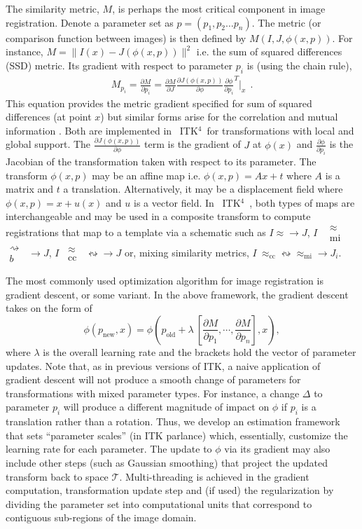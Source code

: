 \documentclass{llncs}
\newcommand{\bsp}{$\substack{
   \rightsquigarrow \\
   b
  }$}
\newcommand{\mi}{$\substack{
   \approx \\
   \text{mi}
  }$}
\newcommand{\cc}{$\substack{
   \approx \\
   \text{cc}
  }$}
\newcommand{\tk}{~ITK$^{\text{4}}$~}
\begin{document}
The similarity metric, $M$, is perhaps the most critical component in image registration.  
Denote a parameter set as $p = (p_1, p_2 \ldots p_n)$.  
The metric (or comparison function between images) is then defined by $M(I,J,\phi(x,p))$.  For instance, $M=\|
I(x)-J(\phi(x,p)) \|^2$ i.e. the sum of squared differences (SSD) metric. Its gradient with respect to parameter $p_i$
is (using the chain rule), 
\begin{eqnarray}
 M_{p_i}=\frac{\partial M}{\partial
  p_i}=\frac{\partial M}{\partial J}\frac{\partial
  J(\phi(x,p))}{\partial \phi} \frac{\partial \phi}{\partial p_i}^T|_x
~~.
\label{eq:grad}
\end{eqnarray}
This equation provides the metric gradient specified for
sum of squared differences (at point $x$) but similar forms arise for the correlation
and mutual information \cite{hermosillo}.  Both are implemented in
\tk for transformations with local and global support.  The
$\frac{\partial J(\phi(x,p))}{\partial \phi}$ term is the gradient of $J$ at $\phi(x)$
and $\frac{\partial \phi}{\partial p_i}$ is the Jacobian of the transformation taken
with respect to its parameter.   The transform $\phi(x,p)$ may be
an affine map i.e. $\phi(x,p)=A x + t$ where $A$ is a matrix and
$t$ a translation.  Alternatively, it may be a displacement field
where $\phi(x,p)=x+u(x)$ and
$u$ is a vector field.  In \tk, both types of maps are interchangeable
and may be used in a composite transform to compute registrations that
map to a template via a schematic such as $ I \approx \rightarrow J $, $ I $ ~\mi~\bsp~$
\rightarrow  J $, $ I $~\cc~$ \leftrightsquigarrow \rightarrow J $
or, mixing similarity metrics, $I
~\approx_\text{cc}  \leftrightsquigarrow \approx_\text{mi}  \rightarrow
J_i $.  

The most commonly used optimization algorithm for image registration
is gradient descent, or some variant.   In the above framework, the
gradient descent takes on the form of
$$
\phi(p_\text{new},x)=\phi(p_\text{old}+\lambda~[ \frac{\partial
  M}{\partial p_1} , \cdots , \frac{\partial
  M}{\partial p_n} ] ,  x ),
$$
where $\lambda$ is the overall learning rate and the brackets hold the
vector of parameter updates.  Note that, as in previous versions of
ITK, a naive application of gradient descent will not produce a smooth
change of parameters for transformations with mixed parameter types.
For instance, a change $\Delta$ to parameter $p_i$ will produce a
different magnitude of impact on $\phi$ if $p_i$ is a translation rather than a
rotation.  Thus, we develop an estimation framework that sets
``parameter scales'' (in ITK parlance) which, essentially, customize
the learning rate for each parameter.  The update to
$\phi$ via its gradient may also include other steps (such as Gaussian
smoothing) that project the updated transform back to space
$\mathcal{T}$.  Multi-threading is achieved in the gradient computation, transformation update
step and (if used) the regularization by dividing the parameter set
into computational units that correspond to contiguous sub-regions of the image domain.
\end{document}
